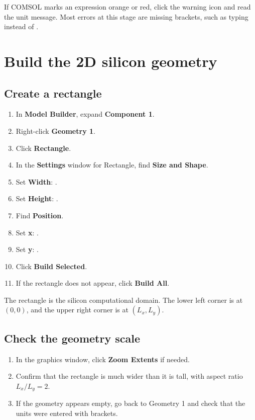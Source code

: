 \documentclass[11pt]{article}
\newcommand{\code}[1]{\texttt{\detokenize{#1}}}
\begin{document}
If COMSOL marks an expression orange or red, click the warning icon and read the unit message. Most errors at this stage are missing brackets, such as typing \code{10um} instead of \code{10[um]}.

\section{Build the 2D silicon geometry}

\subsection{Create a rectangle}

\begin{enumerate}[leftmargin=2em]
\item In \textbf{Model Builder}, expand \textbf{Component 1}.
\item Right-click \textbf{Geometry 1}.
\item Click \textbf{Rectangle}.
\item In the \textbf{Settings} window for Rectangle, find \textbf{Size and Shape}.
\item Set \textbf{Width}: \code{Lx}.
\item Set \textbf{Height}: \code{Ly}.
\item Find \textbf{Position}.
\item Set \textbf{x}: \code{0}.
\item Set \textbf{y}: \code{0}.
\item Click \textbf{Build Selected}.
\item If the rectangle does not appear, click \textbf{Build All}.
\end{enumerate}

The rectangle is the silicon computational domain. The lower left corner is at $(0,0)$, and the upper right corner is at $(L_x,L_y)$.

\subsection{Check the geometry scale}

\begin{enumerate}[leftmargin=2em]
\item In the graphics window, click \textbf{Zoom Extents} if needed.
\item Confirm that the rectangle is much wider than it is tall, with aspect ratio $L_x/L_y=2$.
\item If the geometry appears empty, go back to Geometry 1 and check that the units were entered with brackets.
\end{enumerate}
\end{document}
